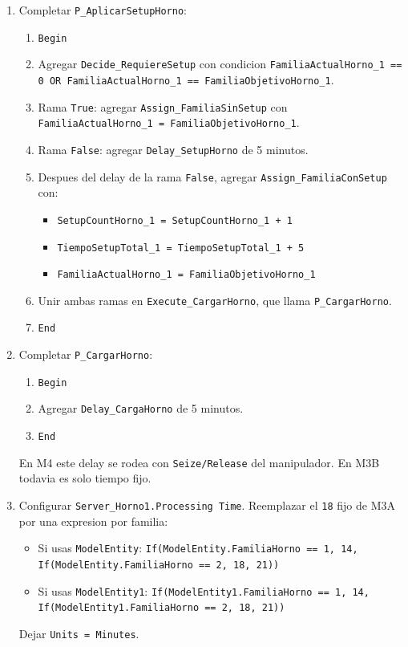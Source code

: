 \documentclass[11pt]{article}
\newcommand{\simio}[1]{\texttt{#1}}
\newcommand{\state}[1]{\texttt{#1}}
\newcommand{\proc}[1]{\texttt{#1}}
\begin{document}
\begin{enumerate}
  \item Completar \proc{P\_AplicarSetupHorno}:
  \begin{enumerate}
    \item \simio{Begin}
    \item Agregar \simio{Decide\_RequiereSetup} con condicion \state{FamiliaActualHorno\_1 == 0 OR FamiliaActualHorno\_1 == FamiliaObjetivoHorno\_1}.
    \item Rama \simio{True}: agregar \simio{Assign\_FamiliaSinSetup} con \state{FamiliaActualHorno\_1 = FamiliaObjetivoHorno\_1}.
    \item Rama \simio{False}: agregar \simio{Delay\_SetupHorno} de 5 minutos.
    \item Despues del delay de la rama \simio{False}, agregar \simio{Assign\_FamiliaConSetup} con:
    \begin{itemize}
      \item \state{SetupCountHorno\_1 = SetupCountHorno\_1 + 1}
      \item \state{TiempoSetupTotal\_1 = TiempoSetupTotal\_1 + 5}
      \item \state{FamiliaActualHorno\_1 = FamiliaObjetivoHorno\_1}
    \end{itemize}
    \item Unir ambas ramas en \simio{Execute\_CargarHorno}, que llama \proc{P\_CargarHorno}.
    \item \simio{End}
  \end{enumerate}

  \item Completar \proc{P\_CargarHorno}:
  \begin{enumerate}
    \item \simio{Begin}
    \item Agregar \simio{Delay\_CargaHorno} de 5 minutos.
    \item \simio{End}
  \end{enumerate}
  En M4 este delay se rodea con \simio{Seize/Release} del manipulador. En M3B todavia es solo tiempo fijo.

  \item Configurar \simio{Server\_Horno1.Processing Time}. Reemplazar el \state{18} fijo de M3A por una expresion por familia:
  \begin{itemize}
    \item Si usas \simio{ModelEntity}: \state{If(ModelEntity.FamiliaHorno == 1, 14, If(ModelEntity.FamiliaHorno == 2, 18, 21))}
    \item Si usas \simio{ModelEntity1}: \state{If(ModelEntity1.FamiliaHorno == 1, 14, If(ModelEntity1.FamiliaHorno == 2, 18, 21))}
  \end{itemize}
  Dejar \simio{Units = Minutes}.


\end{enumerate}
\end{document}
